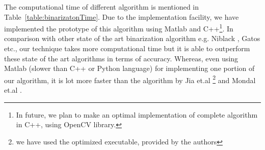 \documentclass[runningheads]{llncs}
\begin{document}
The computational time of different algorithm is mentioned in Table~\ref{table:binarizatonTime}. Due to the implementation facility, we have implemented the prototype of this algorithm using Matlab and C++\footnote{In future, we plan to make an optimal implementation of complete algorithm in C++, using OpenCV library.}. In comparison with other state of the art binarization algorithm e.g. Niblack \cite{Pratikakis2018}, Gatos \cite{Gatos2006} etc., our technique takes more computational time but it is able to outperform these state of the art algorithms in terms of accuracy. Whereas, even using Matlab (slower than C++ or Python language) for implementing one portion of our algorithm, it is lot more faster than the algorithm by Jia et.al \cite{Jia2018} \footnote{we have used the optimized executable, provided by the authors} and Mondal et.al \cite{Mondal2019}.    
\end{document}
